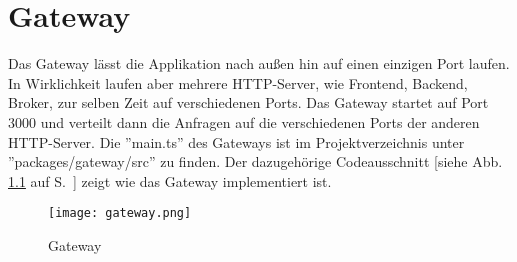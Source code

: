 \chapter{Gateway}
Das Gateway lässt die Applikation nach außen hin auf einen einzigen Port laufen. In Wirklichkeit laufen aber mehrere HTTP-Server, wie Frontend, Backend, Broker, zur selben Zeit auf verschiedenen Ports. Das Gateway startet auf Port 3000 und verteilt dann die Anfragen auf die verschiedenen Ports der anderen HTTP-Server.
Die ''main.ts'' des Gateways ist im Projektverzeichnis unter ''packages/gateway/src'' zu finden.
Der dazugehörige Codeausschnitt [siehe Abb. \ref{fig: gateway} auf S.~\pageref{fig: gateway}] zeigt wie das Gateway implementiert ist. 

\begin{figure}[h]
    \centering
    \texttt{[image: gateway.png]}
    \caption{Gateway}
    \label{fig: gateway}
\end{figure}